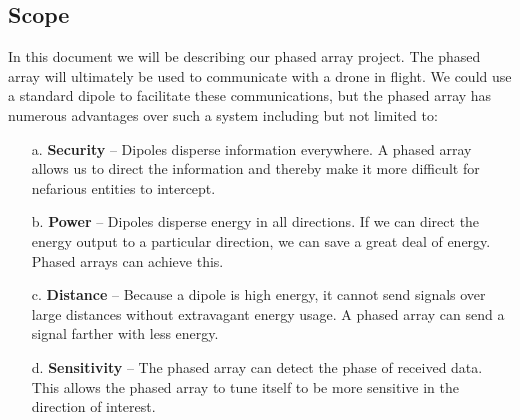 \documentclass[ProjectRequirements.tex]{subfiles}
\begin{document}
	\subsection{Scope}
	In this document we will be describing our phased array project. The phased array will ultimately be used to communicate with a drone in flight. We could use a standard dipole to facilitate these communications, but the phased array has numerous advantages over such a system including but not limited to:
	\begin{itemize} \itemsep1pt
		\item[a.]	\textbf{Security} -- Dipoles disperse information everywhere. A phased array allows us to direct the information and thereby make it more difficult for nefarious entities to intercept.
		\item[b.] 	\textbf{Power} -- Dipoles disperse energy in all directions. If we can direct the energy output to a particular direction, we can save a great deal of energy. Phased arrays can achieve this.
		\item[c.] 	\textbf{Distance} -- Because a dipole is high energy, it cannot send signals over large distances without extravagant energy usage. A phased array can send a signal farther with less energy.
			\item[d.] 	\textbf{Sensitivity} -- The phased array can detect the phase of received data. This allows the phased array to tune itself to be more sensitive in the direction of interest.
	\end{itemize}
\end{document}
